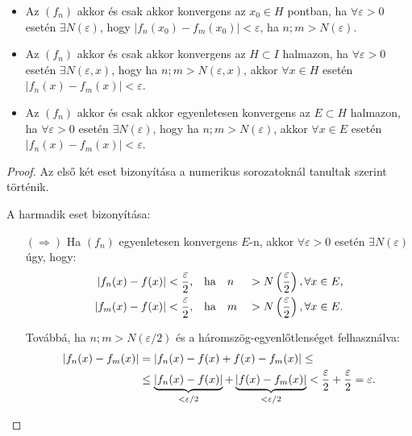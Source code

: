 \clearpage
\begin{theorem}
  \begin{itemize}
    \item Az $(f_n)$ akkor és csak akkor konvergens az $x_0 \in H$ pontban,
          ha $\forall \varepsilon > 0$ esetén $\exists N(\varepsilon)$, hogy
          $|f_n(x_0) - f_m(x_0)| < \varepsilon$, ha $n; m > N(\varepsilon)$.

    \item Az $(f_n)$ akkor és csak akkor konvergens az $H \subset I$ halmazon,
          ha $\forall \varepsilon > 0$ esetén $\exists N(\varepsilon, x)$, hogy
          ha $n; m > N(\varepsilon, x)$, akkor $\forall x \in H$ esetén
          $|f_n(x) - f_m(x)| < \varepsilon$.

    \item Az $(f_n)$ akkor és csak akkor egyenletesen konvergens az
          $E \subset H$ halmazon, ha $\forall \varepsilon > 0$ esetén
          $\exists N(\varepsilon)$, hogy ha $n; m > N(\varepsilon)$, akkor
          $\forall x \in E$ esetén ${|f_n(x) - f_m(x)| < \varepsilon}$.
  \end{itemize}

  \begin{proof}
    Az első két eset bizonyítása a numerikus sorozatoknál tanultak szerint
    történik.

    A harmadik eset bizonyítása:
    \begin{itemize}
      \item[$(\Rightarrow)$] Ha $(f_n)$ egyenletesen konvergens $E$-n, akkor
            $\forall \varepsilon > 0$ esetén $\exists N(\varepsilon)$ úgy, hogy:
            \begin{alignat*}{9}
              |f_n(x) - f(x)| & < \frac{\varepsilon}{2}
              \text, \quad \text{ha} \quad
              n               & \;>\;                   & N\left(\frac{\varepsilon}{2}\right), \forall x \in E
              \text,
              \\
              |f_m(x) - f(x)| & < \frac{\varepsilon}{2}
              \text, \quad \text{ha} \quad
              m               & \;>\;                   & N\left(\frac{\varepsilon}{2}\right), \forall x \in E
              \text.
            \end{alignat*}

            Továbbá, ha $n; m > N(\varepsilon / 2)$ és a
            háromszög-egyenlőtlenséget felhasználva:
            \begin{align*}
              |f_n(x) - f_m(x)|
               & = |f_n(x) - f(x) + f(x) - f_m(x)| \leq
              \\
               & \leq \underbrace{|f_n(x) - f(x)|}_{< \varepsilon / 2}
              + \underbrace{|f(x) - f_m(x)|}_{< \varepsilon / 2}
              < \frac{\varepsilon}{2} + \frac{\varepsilon}{2}
              = \varepsilon
              \text.
            \end{align*}


\end{itemize}
\end{proof}
\end{theorem}
